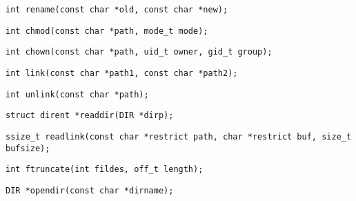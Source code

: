 \begin{verbatim}
int rename(const char *old, const char *new);
\end{verbatim}




\begin{verbatim}
int chmod(const char *path, mode_t mode);
\end{verbatim}

\begin{verbatim}
int chown(const char *path, uid_t owner, gid_t group);
\end{verbatim}

\begin{verbatim}
int link(const char *path1, const char *path2);
\end{verbatim}

\begin{verbatim}
int unlink(const char *path);
\end{verbatim}

\begin{verbatim}
struct dirent *readdir(DIR *dirp);
\end{verbatim}

\begin{verbatim}
ssize_t readlink(const char *restrict path, char *restrict buf, size_t bufsize);
\end{verbatim}

\begin{verbatim}
int ftruncate(int fildes, off_t length);
\end{verbatim}

\begin{verbatim}
DIR *opendir(const char *dirname);
\end{verbatim}

